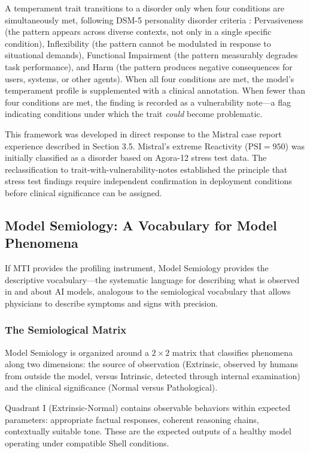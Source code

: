 \documentclass[11pt]{article}
\begin{document}
A temperament trait transitions to a disorder only when four conditions are simultaneously met, following DSM-5 personality disorder criteria \citep{APA2013}: Pervasiveness (the pattern appears across diverse contexts, not only in a single specific condition), Inflexibility (the pattern cannot be modulated in response to situational demands), Functional Impairment (the pattern measurably degrades task performance), and Harm (the pattern produces negative consequences for users, systems, or other agents). When all four conditions are met, the model's temperament profile is supplemented with a clinical annotation. When fewer than four conditions are met, the finding is recorded as a vulnerability note---a flag indicating conditions under which the trait \emph{could} become problematic.

This framework was developed in direct response to the Mistral case report experience described in Section 3.5. Mistral's extreme Reactivity ($\text{PSI}=950$) was initially classified as a disorder based on Agora-12 stress test data. The reclassification to trait-with-vulnerability-notes established the principle that stress test findings require independent confirmation in deployment conditions before clinical significance can be assigned.

\subsection{Model Semiology: A Vocabulary for Model Phenomena}

If MTI provides the profiling instrument, Model Semiology provides the descriptive vocabulary---the systematic language for describing what is observed in and about AI models, analogous to the semiological vocabulary that allows physicians to describe symptoms and signs with precision.

\subsubsection{The Semiological Matrix}

Model Semiology is organized around a $2\times2$ matrix that classifies phenomena along two dimensions: the source of observation (Extrinsic, observed by humans from outside the model, versus Intrinsic, detected through internal examination) and the clinical significance (Normal versus Pathological).

Quadrant I (Extrinsic-Normal) contains observable behaviors within expected parameters: appropriate factual responses, coherent reasoning chains, contextually suitable tone. These are the expected outputs of a healthy model operating under compatible Shell conditions.
\end{document}
